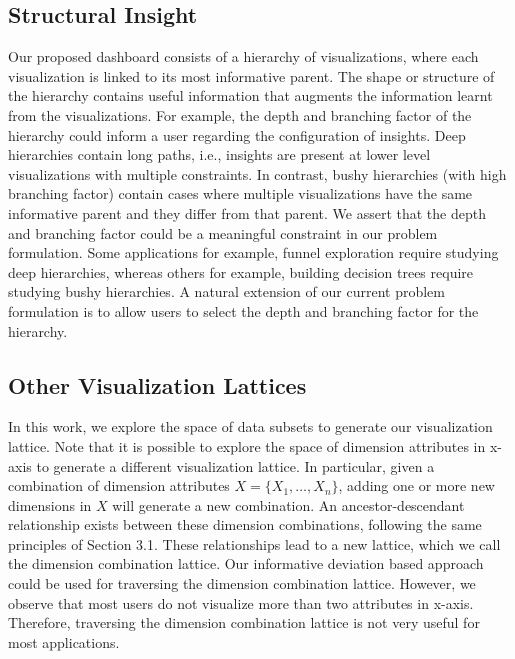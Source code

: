 \subsection{Structural Insight}
Our proposed dashboard consists of a hierarchy of visualizations, where each visualization is linked to its most informative parent. The shape or structure of the hierarchy contains useful information that augments the information learnt from the visualizations.  For example, the depth and branching factor of the hierarchy could inform a user regarding the configuration of insights. Deep hierarchies contain long paths, i.e., insights are present at lower level visualizations with multiple constraints. In contrast, bushy hierarchies (with high branching factor) contain cases where multiple visualizations have the same informative parent and they differ from that parent. We assert that the depth and branching factor could be a meaningful constraint in our problem formulation. Some applications for example, funnel exploration require studying deep hierarchies, whereas others for example, building decision trees require studying bushy hierarchies. A natural extension of our current problem formulation is to allow users to select the depth and branching factor for the hierarchy.

\subsection{Other Visualization Lattices}
In this work, we explore the space of data subsets to generate our visualization lattice. Note that it is possible to explore the space of dimension attributes in x-axis to generate a different visualization lattice. In particular, given a combination of dimension attributes $X = \{X_1, \ldots, X_n\}$, adding one or more new dimensions in $X$ will generate a new combination. An ancestor-descendant relationship exists between these dimension combinations, following the same principles of Section 3.1. These relationships lead to a new lattice, which we call the dimension combination lattice. Our informative deviation based approach could be used for traversing the dimension combination lattice. However, we observe that most users do not visualize more than two attributes in x-axis. Therefore, traversing the dimension combination lattice is not very useful for most applications.




